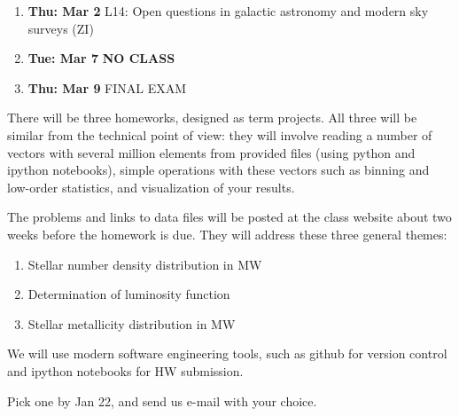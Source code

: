 \documentclass[10pt]{article}
\begin{document}
\begin{enumerate}
  \item {\bf Thu: Mar 2}  L14: Open questions in galactic astronomy and modern sky surveys (ZI) 
  \item {\bf Tue: Mar  7}  {\bf NO CLASS}
  \item {\bf Thu: Mar 9}   FINAL EXAM
\end{enumerate}


\vskip 0.2in


There will be three homeworks, designed as term projects. All three will be similar
from the technical point of view: they will involve reading a number of vectors with several 
million elements from provided files (using python and ipython notebooks), simple operations 
with these vectors such as binning and low-order statistics, and visualization of your results. 

The problems and links to data files will be posted at the class website about two weeks 
before the homework is due. They will address these three general themes:

\begin{enumerate}
\item Stellar number density distribution in MW
\item Determination of luminosity function 
\item Stellar metallicity distribution in MW  
\end{enumerate}

We will use modern software engineering tools, such as github for version control and ipython 
notebooks for HW submission. 

\vskip 0.2in

 Pick one by Jan 22, and send
us e-mail with your choice.
\end{document}
